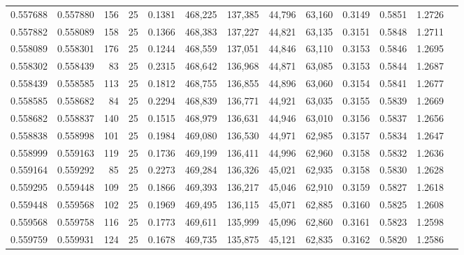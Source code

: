 \begin{tabular}{rrrrrrrrrrrrr}
0.557688 & 0.557880 &   156 &  25 &                                     0.1381 & 468,225 & 137,385 &  44,796 &  63,160 & 0.3149 & 0.5851 & 1.2726 \\
0.557882 & 0.558089 &   158 &  25 &                                     0.1366 & 468,383 & 137,227 &  44,821 &  63,135 & 0.3151 & 0.5848 & 1.2711 \\
0.558089 & 0.558301 &   176 &  25 &                                     0.1244 & 468,559 & 137,051 &  44,846 &  63,110 & 0.3153 & 0.5846 & 1.2695 \\
0.558302 & 0.558439 &    83 &  25 &                                     0.2315 & 468,642 & 136,968 &  44,871 &  63,085 & 0.3153 & 0.5844 & 1.2687 \\
0.558439 & 0.558585 &   113 &  25 &                                     0.1812 & 468,755 & 136,855 &  44,896 &  63,060 & 0.3154 & 0.5841 & 1.2677 \\
0.558585 & 0.558682 &    84 &  25 &                                     0.2294 & 468,839 & 136,771 &  44,921 &  63,035 & 0.3155 & 0.5839 & 1.2669 \\
0.558682 & 0.558837 &   140 &  25 &                                     0.1515 & 468,979 & 136,631 &  44,946 &  63,010 & 0.3156 & 0.5837 & 1.2656 \\
0.558838 & 0.558998 &   101 &  25 &                                     0.1984 & 469,080 & 136,530 &  44,971 &  62,985 & 0.3157 & 0.5834 & 1.2647 \\
0.558999 & 0.559163 &   119 &  25 &                                     0.1736 & 469,199 & 136,411 &  44,996 &  62,960 & 0.3158 & 0.5832 & 1.2636 \\
0.559164 & 0.559292 &    85 &  25 &                                     0.2273 & 469,284 & 136,326 &  45,021 &  62,935 & 0.3158 & 0.5830 & 1.2628 \\
0.559295 & 0.559448 &   109 &  25 &                                     0.1866 & 469,393 & 136,217 &  45,046 &  62,910 & 0.3159 & 0.5827 & 1.2618 \\
0.559448 & 0.559568 &   102 &  25 &                                     0.1969 & 469,495 & 136,115 &  45,071 &  62,885 & 0.3160 & 0.5825 & 1.2608 \\
0.559568 & 0.559758 &   116 &  25 &                                     0.1773 & 469,611 & 135,999 &  45,096 &  62,860 & 0.3161 & 0.5823 & 1.2598 \\
0.559759 & 0.559931 &   124 &  25 &                                     0.1678 & 469,735 & 135,875 &  45,121 &  62,835 & 0.3162 & 0.5820 & 1.2586 \\

\end{tabular}

